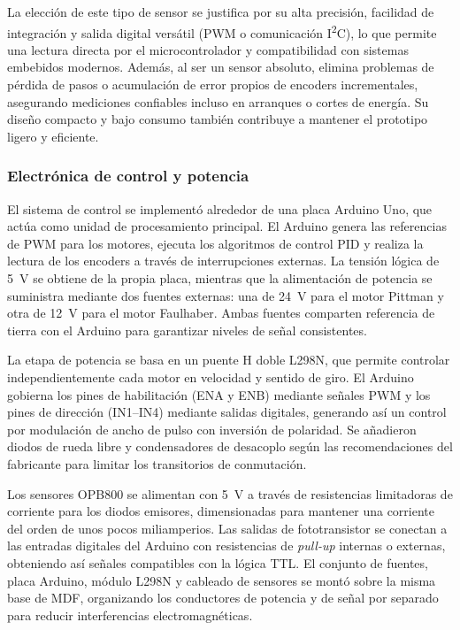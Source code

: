 \documentclass[11pt,a4paper]{article}
\begin{document}
La elección de este tipo de sensor se justifica por su alta precisión, facilidad de integración y salida digital versátil (PWM o comunicación I\textsuperscript{2}C), lo que permite una lectura directa por el microcontrolador y compatibilidad con sistemas embebidos modernos. Además, al ser un sensor absoluto, elimina problemas de pérdida de pasos o acumulación de error propios de encoders incrementales, asegurando mediciones confiables incluso en arranques o cortes de energía. Su diseño compacto y bajo consumo también contribuye a mantener el prototipo ligero y eficiente.

\subsubsection{Electrónica de control y potencia}

El sistema de control se implementó alrededor de una placa Arduino Uno, que actúa como unidad de procesamiento principal. El Arduino genera las referencias de PWM para los motores, ejecuta los algoritmos de control PID y realiza la lectura de los encoders a través de interrupciones externas. La tensión lógica de \SI{5}{\volt} se obtiene de la propia placa, mientras que la alimentación de potencia se suministra mediante dos fuentes externas: una de \SI{24}{\volt} para el motor Pittman y otra de \SI{12}{\volt} para el motor Faulhaber. Ambas fuentes comparten referencia de tierra con el Arduino para garantizar niveles de señal consistentes.

La etapa de potencia se basa en un puente H doble L298N, que permite controlar independientemente cada motor en velocidad y sentido de giro. El Arduino gobierna los pines de habilitación (ENA y ENB) mediante señales PWM y los pines de dirección (IN1–IN4) mediante salidas digitales, generando así un control por modulación de ancho de pulso con inversión de polaridad. Se añadieron diodos de rueda libre y condensadores de desacoplo según las recomendaciones del fabricante para limitar los transitorios de conmutación.

Los sensores OPB800 se alimentan con \SI{5}{\volt} a través de resistencias limitadoras de corriente para los diodos emisores, dimensionadas para mantener una corriente del orden de unos pocos miliamperios. Las salidas de fototransistor se conectan a las entradas digitales del Arduino con resistencias de \emph{pull-up} internas o externas, obteniendo así señales compatibles con la lógica TTL. El conjunto de fuentes, placa Arduino, módulo L298N y cableado de sensores se montó sobre la misma base de MDF, organizando los conductores de potencia y de señal por separado para reducir interferencias electromagnéticas.
\end{document}
